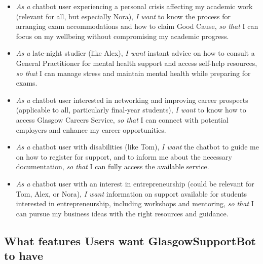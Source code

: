 \documentclass{l4proj}
\begin{document}
\begin{itemize}
    \item \textit{As a} chatbot user experiencing a personal crisis affecting my academic work (relevant for all, but especially Nora), \textit{I want} to know the process for arranging exam accommodations and how to claim Good Cause, \textit{so that} I can focus on my wellbeing without compromising my academic progress.
    
    \item \textit{As a} late-night studier (like Alex), \textit{I want} instant advice on how to consult a General Practitioner for mental health support and access self-help resources, \textit{so that} I can manage stress and maintain mental health while preparing for exams.
    
    \item \textit{As a} chatbot user interested in networking and improving career prospects (applicable to all, particularly final-year students), \textit{I want} to know how to access Glasgow Careers Service, \textit{so that} I can connect with potential employers and enhance my career opportunities.
    
    \item \textit{As a} chatbot user with disabilities (like Tom), \textit{I want} the chatbot to guide me on how to register for support, and to inform me about the necessary documentation, \textit{so that} I can fully access the available service.
    
    \item \textit{As a} chatbot user with an interest in entrepreneurship (could be relevant for Tom, Alex, or Nora), \textit{I want} information on support available for students interested in entrepreneurship, including workshops and mentoring, \textit{so that} I can pursue my business ideas with the right resources and guidance.
    
\end{itemize}

\subsection{What features Users want GlasgowSupportBot to have}
\end{document}
